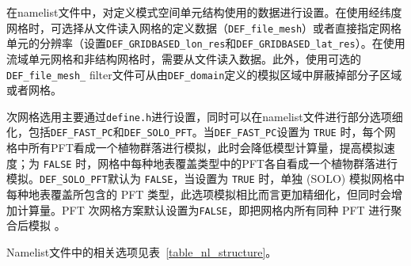 在namelist文件中，对定义模式空间单元结构使用的数据进行设置。在使用经纬度网格时，可选择从文件读入网格的定义数据（\texttt{DEF\_file\_mesh}）或者直接指定网格单元的分辨率（设置\texttt{DEF\_GRIDBASED\_lon\_res}和\texttt{DEF\_GRIDBASED\_lat\_res}）。在使用流域单元网格和非结构网格时，需要从文件读入数据。此外，使用可选的\texttt{DEF\_file\_mesh\_\allowbreak} filter文件可从由\texttt{DEF\_domain}定义的模拟区域中屏蔽掉部分子区域或者网格。

次网格选用主要通过\texttt{define.h}进行设置，同时可以在namelist文件进行部分选项细化，包括\texttt{DEF\_FAST\_PC}和\texttt{DEF\_SOLO\_PFT}。当\texttt{DEF\_FAST\_PC}设置为 \texttt{TRUE} 时，每个网格中所有PFT看成一个植物群落进行模拟，此时会降低模型计算量，提高模拟速度；为 \texttt{FALSE} 时，网格中每种地表覆盖类型中的PFT各自看成一个植物群落进行模拟。\texttt{DEF\_SOLO\_PFT}默认为 \texttt{FALSE}，当设置为 \texttt{TRUE} 时，单独 (SOLO) 模拟网格中每种地表覆盖所包含的 PFT 类型，此选项模拟相比而言更加精细化，但同时会增加计算量。PFT 次网格方案默认设置为\texttt{FALSE}，即把网格内所有同种 PFT 进行聚合后模拟 。

Namelist文件中的相关选项见表~\ref{table_nl_structure}。

